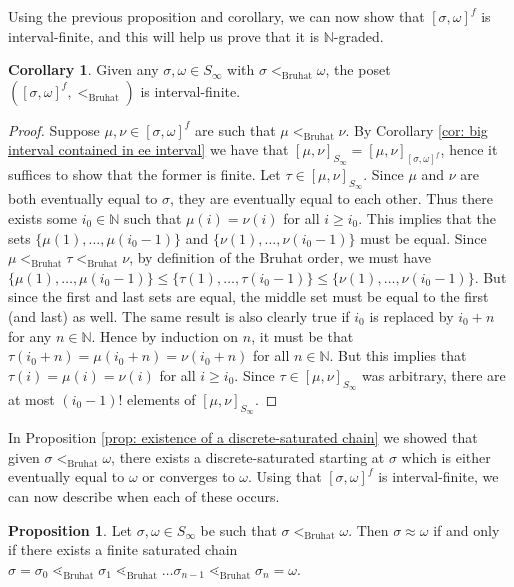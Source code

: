\documentclass[oneside,11pt,reqno]{amsart}
\newcommand{\nn}{\ensuremath{\mathbb{N}}}
\theoremstyle{definition}
\newtheorem{proof techniques}{Proof Techniques}
\newtheorem{corollary}{Corollary}
\newtheorem{proposition}{Proposition}
\begin{document}
Using the previous proposition and corollary, we can now show that $[\sigma , \omega]^f$ is interval-finite, and this will help us prove that it is $\nn$-graded. 

\begin{corollary}\label{cor: delta f in S infinity is interval-finite}
    Given any $\sigma , \omega \in S_\infty$ with $\sigma <_\text{Bruhat} \omega$, the poset $([\sigma , \omega]^f, <_\text{Bruhat})$ is interval-finite. 
\end{corollary}

\begin{proof}
    Suppose $\mu , \nu \in [\sigma , \omega]^f$ are such that $\mu <_\text{Bruhat} \nu$. By Corollary \ref{cor: big interval contained in ee interval} we have that $[\mu , \nu]_{S_\infty} = [\mu , \nu]_{[\sigma , \omega]^f}$, hence it suffices to show that the former is finite. Let $\tau \in [\mu , \nu]_{S_\infty}$. Since $\mu$ and $\nu$ are both eventually equal to $\sigma$, they are eventually equal to each other. Thus there exists some $i_0 \in \nn$ such that $\mu(i) = \nu(i)$ for all $i \geq i_0$. This implies that the sets $\{ \mu(1) , \ldots, \mu(i_0  - 1) \}$ and $\{ \nu(1) , \ldots, \nu(i_0  - 1) \}$ must be equal. Since $\mu <_\text{Bruhat} \tau <_\text{Bruhat} \nu$, by definition of the Bruhat order, we must have $\{ \mu(1) , \ldots, \mu(i_0  - 1) \} \leq \{ \tau(1) , \ldots, \tau(i_0  - 1) \} \leq \{ \nu(1) , \ldots, \nu(i_0  - 1) \}$. But since the first and last sets are equal, the middle set must be equal to the first (and last) as well. The same result is also clearly true if $i_0$ is replaced by $i_0 + n$ for any $n \in \nn$. Hence by induction on $n$, it must be that $\tau(i_0 + n) = \mu(i_0 + n) = \nu(i_0 + n)$ for all $n \in \nn$. But this implies that $\tau(i) = \mu(i) = \nu(i)$ for all $i \geq i_0$. Since $\tau \in [\mu , \nu]_{S_\infty}$ was arbitrary, there are at most $(i_0  - 1)!$ elements of $[\mu , \nu]_{S_\infty}$. 
\end{proof}

In Proposition \ref{prop: existence of a discrete-saturated chain} we showed that given $\sigma <_\text{Bruhat} \omega$, there exists a discrete-saturated starting at $\sigma$ which is either eventually equal to $\omega$ or converges to $\omega$. Using that $[\sigma , \omega]^f$ is interval-finite, we can now describe when each of these occurs. 

\begin{proposition}\label{prop: when a discrete-saturated chain is finite}
    Let $\sigma , \omega \in S_\infty$ be such that $\sigma <_\text{Bruhat} \omega$. Then $\sigma \approx \omega$ if and only if there exists a finite saturated chain $\sigma  = \sigma_0 \lessdot_\text{Bruhat} \sigma_1 \lessdot_\text{Bruhat} \ldots \sigma_{n - 1} \lessdot_\text{Bruhat} \sigma_n = \omega$.
\end{proposition}
\end{document}

